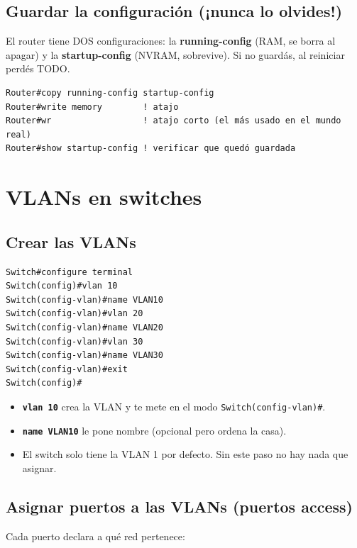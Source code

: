 \documentclass[11pt,a4paper]{report}
\newcommand{\cmd}[1]{\texttt{\textbf{#1}}}
\newcommand{\prompt}[1]{\texttt{#1}}
\begin{document}
\section{Guardar la configuración (¡nunca lo olvides!)}

El router tiene DOS configuraciones: la \textbf{running-config} (RAM, se borra al apagar) y la \textbf{startup-config} (NVRAM, sobrevive). Si no guardás, al reiniciar perdés TODO.

\begin{lstlisting}
Router#copy running-config startup-config
Router#write memory        ! atajo
Router#wr                  ! atajo corto (el más usado en el mundo real)
Router#show startup-config ! verificar que quedó guardada
\end{lstlisting}

\chapter{VLANs en switches}

\section{Crear las VLANs}

\begin{lstlisting}
Switch#configure terminal
Switch(config)#vlan 10
Switch(config-vlan)#name VLAN10
Switch(config-vlan)#vlan 20
Switch(config-vlan)#name VLAN20
Switch(config-vlan)#vlan 30
Switch(config-vlan)#name VLAN30
Switch(config-vlan)#exit
Switch(config)#
\end{lstlisting}

\begin{itemize}
  \item \cmd{vlan 10} crea la VLAN y te mete en el modo \prompt{Switch(config-vlan)\#}.
  \item \cmd{name VLAN10} le pone nombre (opcional pero ordena la casa).
  \item El switch solo tiene la VLAN 1 por defecto. Sin este paso no hay nada que asignar.
\end{itemize}

\section{Asignar puertos a las VLANs (puertos access)}

Cada puerto declara a qué red pertenece:
\end{document}

